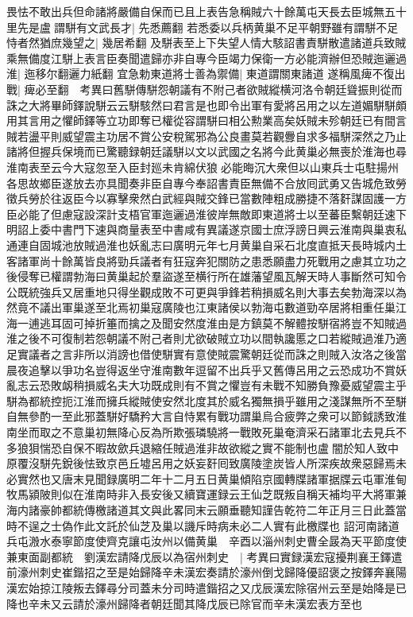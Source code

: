 畏怯不敢出兵但命諸將嚴備自保而已且上表告急稱賊六十餘萬屯天長去臣城無五十里先是盧謂駢有文武長才|{
	先悉薦翻}
若悉委以兵柄黄巢不足平朝野雖有謂駢不足恃者然猶庶幾望之|{
	幾居希翻}
及駢表至上下失望人情大駭詔書責駢散遣諸道兵致賊乘無備度江駢上表言臣奏聞遣歸亦非自專今臣竭力保衛一方必能濟辦但恐賊迤邐過淮|{
	迤移尔翻邐力紙翻}
宜急勅東道將士善為禦備|{
	東道謂關東諸道}
遂稱風痺不復出戰|{
	痺必至翻　考異曰舊駢傳駢怨朝議有不附己者欲賊縱横河洛令朝廷聳振則從而誅之大將畢師鐸說駢云云駢駭然曰君言是也即令出軍有愛將呂用之以左道媚駢駢頗用其言用之懼師鐸等立功即奪已權從容謂駢曰相公勲業高矣妖賊未殄朝廷已有間言賊若盪平則威望震主功居不賞公安稅駕邪為公良畫莫若觀釁自求多福駢深然之乃止諸將但握兵保境而已驚聽録朝廷議駢以文以武國之名將今此黄巢必無喪於淮海也尋淮南表至云今大寇忽至入臣封廵未肯綿伏狼必能晦沉大衆但以山東兵士屯駐揚州各思故鄉臣遂放去亦具聞奏非臣自專今奉詔書責臣無備不合放囘武勇又告城危致勞徵兵勞於往返臣今以寡擊衆然白武經與賊交鋒已當數陣粗成勝捷不落姧謀固護一方臣必能了但慮寇設深計支梧官軍迤邐過淮彼岸無敵即東道將士以至蕃臣繫朝廷速下明詔上委中書門下速與商量表至中書咸有異議遂京國士庶浮謗日興云淮南與巢衷私通連自固城池放賊過淮也妖亂志曰廣明元年七月黄巢自采石北度直抵天長時城内土客諸軍尚十餘萬皆良將勁兵議者有狂寇奔犯關防之患悉願盡力死戰用之慮其立功之後侵奪已權謂勃海曰黄巢起於羣盜遂至横行所在雄藩望風瓦解天時人事斷然可知令公既統強兵又居重地只得坐觀成敗不可更與爭鋒若稍損威名則大事去矣勃海深以為然竟不議出軍巢遂至北焉初巢寇廣陵也江東諸侯以勃海屯數道勁卒居將相重任巢江海一逋逃耳固可掉折箠而擒之及聞安然度淮由是方鎮莫不解體按駢宿將豈不知賊過淮之後不可復制若怨朝議不附己者則尤欲破賊立功以間執讒慝之口若縱賊過淮乃適足實議者之言非所以消謗也借使駢實有意使賊震驚朝廷從而誅之則賊入汝洛之後當晨夜追擊以爭功名豈得返坐守淮南數年逗留不出兵乎又舊傳呂用之云恐成功不賞妖亂志云恐敗衂稍損威名夫大功既成則有不賞之懼豈有未戰不知勝負豫憂威望震主乎駢為都統控扼江淮而擁兵縱賊使安然北度其於威名獨無損乎雖用之淺謀無所不至駢自無參酌一至此邪蓋駢好驕矜大言自恃累有戰功謂巢烏合疲弊之衆可以節鉞誘致淮南坐而取之不意巢初無降心反為所欺張璘驍將一戰敗死巢奄濟采石諸軍北去見兵不多狼狽惴恐自保不暇故歛兵退縮任賊過淮非故欲縱之實不能制也盧闇於知人致中原覆沒駢先銳後怯致京邑丘墟呂用之妖妄姧囘致廣陵塗炭皆人所深疾故衆惡歸焉未必實然也又唐末見聞録廣明二年十二月五日黄巢傾陷京國轉牒諸軍据牒云屯軍淮甸牧馬潁陂則似在淮南時非入長安後又續寶運録云王仙芝既叛自稱天補均平大將軍兼海内諸豪帥都統傳檄諸道其文與此畧同末云願垂聽知謹告乾符二年正月三日此蓋當時不逞之士偽作此文託於仙芝及巢以譏斥時病未必二人實有此檄牒也}
詔河南諸道兵屯溵水泰寧節度使齊克讓屯汝州以備黄巢　辛酉以淄州刺史曹全晸為天平節度使兼東面副都統　劉漢宏請降戊辰以為宿州刺史　|{
	考異曰實録漢宏寇擾荆襄王鐸遣前濠州刺史崔鍇招之至是始歸降辛未漢宏奏請於濠州倒戈歸降優詔褒之按鐸奔襄陽漢宏始掠江陵叛去鐸尋分司蓋未分司時遣鍇招之又戊辰漢宏除宿州云至是始降是已降也辛未又云請於濠州歸降者朝廷聞其降戊辰已除官而辛未漢宏表方至也}
